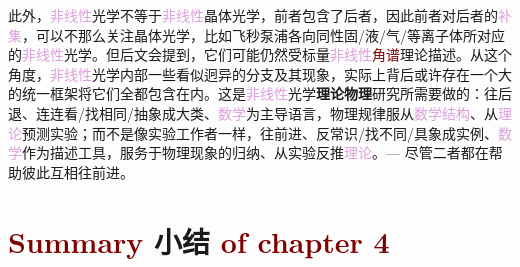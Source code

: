 此外，\textcolor{Plum}{非线性}\textcolor{NavyBlue}{光学}不等于\textcolor{Plum}{非线性}\textcolor{PineGreen}{晶体光学}，前者包含了后者，因此前者对后者的\textcolor{Plum}{补集}，可以不那么关注\textcolor{PineGreen}{晶体光学}，比如\textcolor{NavyBlue}{飞秒泵浦}各向同性\textcolor{NavyBlue}{固}/\textcolor{NavyBlue}{液}/\textcolor{NavyBlue}{气}/\textcolor{NavyBlue}{等离子体}所对应的\textcolor{Plum}{非线性}\textcolor{NavyBlue}{光学}。但后文会提到，它们可能仍然受标量\textcolor{Plum}{非线性}\textcolor{Maroon}{角谱}理论描述。从这个角度，\textcolor{Plum}{非线性}\textcolor{NavyBlue}{光学}内部一些看似迥异的分支及其现象，实际上背后或许存在一个大的统一框架将它们全都包含在内。这是\textcolor{Plum}{非线性}\textcolor{NavyBlue}{光学}\textbf{\textcolor{NavyBlue}{理论物理}}研究所需要做的：往后退、连连看/找相同/抽象成大类、\textcolor{Plum}{数学}为主导语言，\textcolor{NavyBlue}{物理规律}服从\textcolor{Plum}{数学结构}、从\textcolor{Plum}{理论}预测\textcolor{NavyBlue}{实验}；而不是像\textcolor{NavyBlue}{实验工作者}一样，往前进、反常识/找不同/具象成实例、\textcolor{Plum}{数学}作为描述工具，服务于\textcolor{NavyBlue}{物理现象}的归纳、从\textcolor{NavyBlue}{实验}反推\textcolor{Plum}{理论}。--- 尽管二者都在帮助彼此互相往前进。

\vspace*{-1.5em}

\section{\textcolor{Maroon}{Summary} 小结 \textcolor{Maroon}{of chapter 4}}\label{sec:summary-chapter4}

